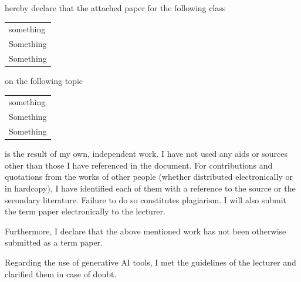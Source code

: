 \documentclass[a4paper,10pt,xcolor=dvipsnames]{article}
\begin{document}
\vspace{0.2cm}

hereby declare that the attached paper for the following class

\vspace{-0.25cm}

\begin{center}
\begin{tabularx}{0.975\textwidth}{|X|}
    \hline
    something\\
    Something\\
    Something\\
    \hline
\end{tabularx}
\end{center}


\vspace{-0.1cm}

on the following topic

\vspace{-0.25cm}

\begin{center}
    \begin{tabularx}{0.975\textwidth}{|X|}
    \hline
    something\\
    Something\\
    Something\\
    \hline
\end{tabularx}
\end{center}


\vspace{0.3cm}


is the result of my own, independent work. I have not used any aids or sources other than those I have referenced in the document. For contributions and quotations from the works of other people (whether distributed electronically or in hardcopy), I have identified each of them with a reference to the source or the secondary literature. Failure to do so constitutes plagiarism. I will also submit the term paper electronically to the lecturer.\\

\vspace{\baselineskip}

Furthermore, I declare that the above mentioned work has not been
otherwise submitted as a term paper.\\

\vspace{\baselineskip}

Regarding the use of generative AI tools, I met the guidelines of the
lecturer and clarified them in case of doubt.
\end{document}
